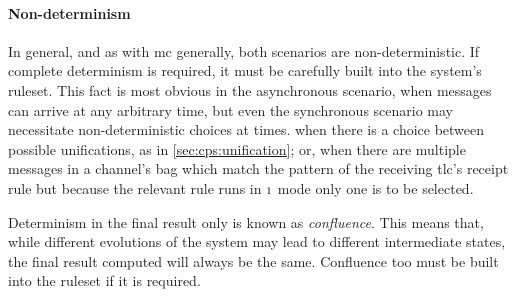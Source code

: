 \paragraph{Non-determinism}
In general, and as with \gls{mc} generally, both scenarios are non-deterministic.  If complete determinism is required, it must be carefully built into the system's \gls{ruleset}.  This fact is most obvious in the asynchronous scenario, when messages can arrive at any arbitrary time, but even the synchronous scenario may necessitate non-deterministic choices at times. \Eg{} when there is a choice between possible
unifications, as in \cref{sec:cps:unification}; or, when there are multiple messages in a channel’s bag
which match the pattern of the receiving \gls{tlc}’s receipt rule but because the relevant rule runs in \({\scriptstyle 1}\) mode only one is to be selected.

Determinism in the final result only is known as \emph{confluence}.  This means that, while different evolutions of the system may lead to different intermediate states, the final result computed will always be the same.  Confluence too must be built into the \gls{ruleset} if it is required.





